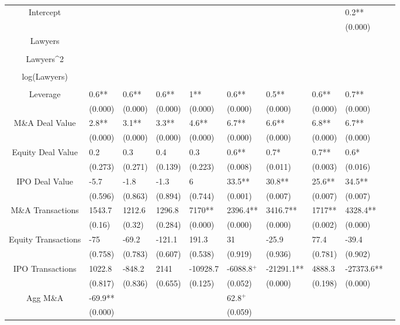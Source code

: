 \documentclass{article}
\begin{document}
\begin{table}[H]
\begin{tabular}{|clllllllll|}
Intercept &  &  &  &  &  &  &  & 0.2** & \\ 
   &  &  &  &  &  &  &  & (0.000) & \\ 
  Lawyers &  &  &  &  &  &  &  &  & \\ 
   &  &  &  &  &  &  &  &  & \\ 
  Lawyers^2 &  &  &  &  &  &  &  &  & \\ 
   &  &  &  &  &  &  &  &  & \\ 
  log(Lawyers) &  &  &  &  &  &  &  &  & \\ 
   &  &  &  &  &  &  &  &  & \\ 
  Leverage & 0.6** & 0.6** & 0.6** & 1** & 0.6** & 0.5** & 0.6** & 0.7** & \\ 
   & (0.000) & (0.000) & (0.000) & (0.000) & (0.000) & (0.000) & (0.000) & (0.000) & \\ 
  M\&A Deal Value & 2.8** & 3.1** & 3.3** & 4.6** & 6.7** & 6.6** & 6.8** & 6.7** & \\ 
   & (0.000) & (0.000) & (0.000) & (0.000) & (0.000) & (0.000) & (0.000) & (0.000) & \\ 
  Equity Deal Value & 0.2 & 0.3 & 0.4 & 0.3 & 0.6** & 0.7* & 0.7** & 0.6* & \\ 
   & (0.273) & (0.271) & (0.139) & (0.223) & (0.008) & (0.011) & (0.003) & (0.016) & \\ 
  IPO Deal Value & -5.7 & -1.8 & -1.3 & 6 & 33.5** & 30.8** & 25.6** & 34.5** & \\ 
   & (0.596) & (0.863) & (0.894) & (0.744) & (0.001) & (0.007) & (0.007) & (0.007) & \\ 
  M\&A Transactions & 1543.7 & 1212.6 & 1296.8 & 7170** & 2396.4** & 3416.7** & 1717** & 4328.4** & \\ 
   & (0.16) & (0.32) & (0.284) & (0.000) & (0.000) & (0.000) & (0.002) & (0.000) & \\ 
  Equity Transactions & -75 & -69.2 & -121.1 & 191.3 & 31 & -25.9 & 77.4 & -39.4 & \\ 
   & (0.758) & (0.783) & (0.607) & (0.538) & (0.919) & (0.936) & (0.781) & (0.902) & \\ 
  IPO Transactions & 1022.8 & -848.2 & 2141 & -10928.7 & -6088.8$^{+}$ & -21291.1** & 4888.3 & -27373.6** & \\ 
   & (0.817) & (0.836) & (0.655) & (0.125) & (0.052) & (0.000) & (0.198) & (0.000) & \\ 
  Agg M\&A & -69.9** &  &  &  & 62.8$^{+}$ &  &  &  & \\ 
   & (0.000) &  &  &  & (0.059) &  &  &  & \\ 

\end{tabular}
\end{table}
\end{document}
